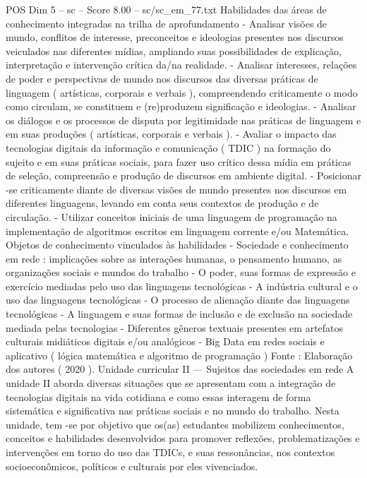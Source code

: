 \begin{textsample}{POS Dim 5 – sc – Score 8.00 – sc/sc\_em\_77.txt}
Habilidades das áreas de conhecimento integradas na trilha de aprofundamento - Analisar visões de mundo, conflitos de interesse, preconceitos e ideologias presentes nos discursos veiculados nas diferentes mídias, ampliando suas possibilidades de explicação, interpretação e intervenção crítica da/na realidade. - Analisar interesses, relações de poder e perspectivas de mundo nos discursos das diversas práticas de linguagem ( artísticas, corporais e verbais ), compreendendo criticamente o modo como circulam, se constituem e (re)produzem significação e ideologias. - Analisar os diálogos e os processos de disputa por legitimidade nas práticas de linguagem e em suas produções ( artísticas, corporais e verbais ). - Avaliar o impacto das tecnologias digitais da informação e comunicação ( TDIC ) na formação do sujeito e em suas práticas sociais, para fazer uso crítico dessa mídia em práticas de seleção, compreensão e produção de discursos em ambiente digital. - Posicionar -se criticamente diante de diversas visões de mundo presentes nos discursos em diferentes linguagens, levando em conta seus contextos de produção e de circulação. - Utilizar conceitos iniciais de uma linguagem de programação na implementação de algoritmos escritos em linguagem corrente e/ou Matemática.
Objetos de conhecimento vinculados às habilidades - Sociedade e conhecimento em rede : implicações sobre as interações humanas, o pensamento humano, as organizações sociais e mundos do trabalho - O poder, suas formas de expressão e exercício mediadas pelo uso das linguagens tecnológicas - A indústria cultural e o uso das linguagens tecnológicas - O processo de alienação diante das linguagens tecnológicas - A linguagem e suas formas de inclusão e de exclusão na sociedade mediada pelas tecnologias - Diferentes gêneros textuais presentes em artefatos culturais midiáticos digitais e/ou analógicos - Big Data em redes sociais e aplicativo ( lógica matemática e algoritmo de programação ) Fonte : Elaboração dos autores ( 2020 ).
Unidade curricular II — Sujeitos das sociedades em rede A unidade II aborda diversas situações que se apresentam com a integração de tecnologias digitais na vida cotidiana e como essas interagem de forma sistemática e significativa nas práticas sociais e no mundo do trabalho.
Nesta unidade, tem -se por objetivo que os(as) estudantes mobilizem conhecimentos, conceitos e habilidades desenvolvidos para promover reflexões, problematizações e intervenções em torno do uso das TDICs, e suas ressonâncias, nos contextos socioeconômicos, políticos e culturais por eles vivenciados.

\end{textsample}
